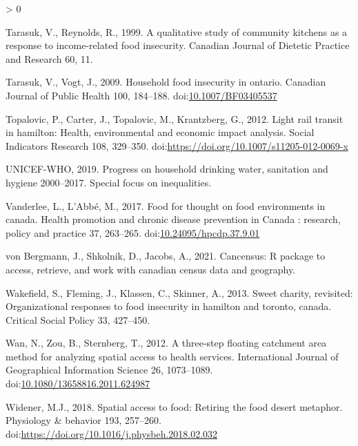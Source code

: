 \documentclass[]{elsarticle} %
\newlength{\cslhangindent}
\newenvironment{CSLReferences}[2] %
 {%
  \setlength{\parindent}{0pt}
  \ifodd #1 \everypar{\setlength{\hangindent}{\cslhangindent}}\ignorespaces\fi
  \ifnum #2 > 0
  \setlength{\parskip}{#2\baselineskip}
  \fi
 }%
 {}
\begin{document}
\begin{CSLReferences}{1}{0}
\leavevmode\hypertarget{ref-tarasuk1999qualitative}{}%
Tarasuk, V., Reynolds, R., 1999. A qualitative study of community
kitchens as a response to income-related food insecurity. Canadian
Journal of Dietetic Practice and Research 60, 11.

\leavevmode\hypertarget{ref-tarasuk2009household}{}%
Tarasuk, V., Vogt, J., 2009. Household food insecurity in ontario.
Canadian Journal of Public Health 100, 184--188.
doi:\href{https://doi.org/10.1007/BF03405537}{10.1007/BF03405537}

\leavevmode\hypertarget{ref-topalovic2012light}{}%
Topalovic, P., Carter, J., Topalovic, M., Krantzberg, G., 2012. Light
rail transit in hamilton: Health, environmental and economic impact
analysis. Social Indicators Research 108, 329--350.
doi:\url{https://doi.org/10.1007/s11205-012-0069-x}

\leavevmode\hypertarget{ref-world2019progress}{}%
UNICEF-WHO, 2019. Progress on household drinking water, sanitation and
hygiene 2000--2017. Special focus on inequalities.

\leavevmode\hypertarget{ref-vanderlee2017food}{}%
Vanderlee, L., L'Abbé, M., 2017. Food for thought on food environments
in canada. Health promotion and chronic disease prevention in Canada :
research, policy and practice 37, 263--265.
doi:\href{https://doi.org/10.24095/hpcdp.37.9.01}{10.24095/hpcdp.37.9.01}

\leavevmode\hypertarget{ref-vonBergmann2021cancensus}{}%
von Bergmann, J., Shkolnik, D., Jacobs, A., 2021. Cancensus: R package
to access, retrieve, and work with canadian census data and geography.

\leavevmode\hypertarget{ref-wakefield2013sweet}{}%
Wakefield, S., Fleming, J., Klassen, C., Skinner, A., 2013. Sweet
charity, revisited: Organizational responses to food insecurity in
hamilton and toronto, canada. Critical Social Policy 33, 427--450.

\leavevmode\hypertarget{ref-wan2012three}{}%
Wan, N., Zou, B., Sternberg, T., 2012. A three-step floating catchment
area method for analyzing spatial access to health services.
International Journal of Geographical Information Science 26,
1073--1089.
doi:\href{https://doi.org/10.1080/13658816.2011.624987}{10.1080/13658816.2011.624987}

\leavevmode\hypertarget{ref-widener2018spatial}{}%
Widener, M.J., 2018. Spatial access to food: Retiring the food desert
metaphor. Physiology \& behavior 193, 257--260.
doi:\url{https://doi.org/10.1016/j.physbeh.2018.02.032}

\end{CSLReferences}
\end{document}
